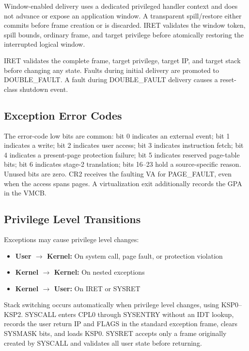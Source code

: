 \documentclass[11pt]{article}
\begin{document}
Window-enabled delivery uses a dedicated privileged handler context and does
not advance or expose an application window. A transparent spill/restore
either commits before frame creation or is discarded. IRET validates the
window token, spill bounds, ordinary frame, and target privilege before
atomically restoring the interrupted logical window.

IRET validates the complete frame, target privilege, target IP, and target stack before changing any state. Faults during initial delivery are promoted to DOUBLE\_FAULT. A fault during DOUBLE\_FAULT delivery causes a reset-class shutdown event.

\subsection{Exception Error Codes}

The error-code low bits are common: bit 0 indicates an external event; bit 1 indicates a write; bit 2 indicates user access; bit 3 indicates instruction fetch; bit 4 indicates a present-page protection failure; bit 5 indicates reserved page-table bits; bit 6 indicates stage-2 translation; bits 16--23 hold a source-specific reason. Unused bits are zero. CR2 receives the faulting VA for PAGE\_FAULT, even when the access spans pages. A virtualization exit additionally records the GPA in the VMCB.

\subsection{Privilege Level Transitions}

Exceptions may cause privilege level changes:

\begin{itemize}
    \item \textbf{User $\rightarrow$ Kernel:} On system call, page fault, or protection violation
    \item \textbf{Kernel $\rightarrow$ Kernel:} On nested exceptions
    \item \textbf{Kernel $\rightarrow$ User:} On IRET or SYSRET
\end{itemize}

Stack switching occurs automatically when privilege level changes, using KSP0--KSP2. SYSCALL enters CPL0 through SYSENTRY without an IDT lookup, records the user return IP and FLAGS in the standard exception frame, clears SYSMASK bits, and loads KSP0. SYSRET accepts only a frame originally created by SYSCALL and validates all user state before returning.
\end{document}

